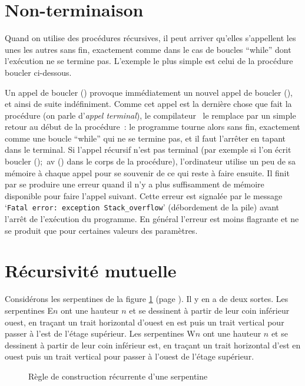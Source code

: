 \section{Non-terminaison}
Quand on utilise des procédures récursives, il peut arriver qu'elles s'appellent les unes les autres
sans fin, exactement comme dans le cas de boucles ``while'' dont l'exécution ne se termine pas. L'exemple le
plus simple est celui de la procédure {\idt boucler} ci-dessous.

\label{prog:NonTerminaison}

Un appel de {\idt boucler ()} provoque immédiatement un nouvel appel de {\idt bou\-cler ()}, et ainsi
de suite indéfiniment. Comme cet appel est la dernière chose que fait la procédure (on parle
d'{\em appel terminal}), le compilateur \ocaml\ le remplace par un simple retour au début de la
procédure~: le programme tourne alors sans fin, exactement comme une boucle ``while'' qui ne se
termine pas, et il faut l'arrêter en tapant ~ dans le terminal. Si l'appel
récursif n'est pas terminal (par exemple si l'on écrit {\idt boucler ();\ av ()} dans le corps
de la procédure), l'ordinateur utilise un peu de sa mémoire à chaque appel pour se souvenir de ce
qui reste à faire ensuite. Il finit par se produire une erreur quand il n'y a plus
suffisamment de mémoire disponible pour faire l'appel suivant. Cette erreur est signalée 
par le message `{\tt Fatal error:\ exception Stack\_overflow}' (débordement de la pile) avant l'arrêt
de l'exécution du programme. En général 
l'erreur est moins flagrante et ne se produit que pour certaines valeurs des paramètres.

\section{Récursivité mutuelle}
Considérons les serpentines de la figure \ref{fig:serprec} (page \pageref{fig:serprec}). Il y en a
de deux sortes.  Les serpentines 
{\idt E$\scriptscriptstyle n$} ont 
une hauteur $n$ et se dessinent à partir de leur coin inférieur ouest, en traçant un trait 
horizontal d'ouest en est puis un trait vertical pour passer à l'est de l'étage supérieur. 
Les serpentines {\idt W$\scriptscriptstyle n$} ont une hauteur $n$ et se dessinent 
à partir de leur coin inférieur est, en traçant un trait horizontal d'est en ouest puis un trait
vertical pour passer à l'ouest de l'étage supérieur.  
\begin{figure}[htbp]
 \caption{Règle de construction récurrente d'une serpentine}\label{fig:serprec}
\end{figure}

